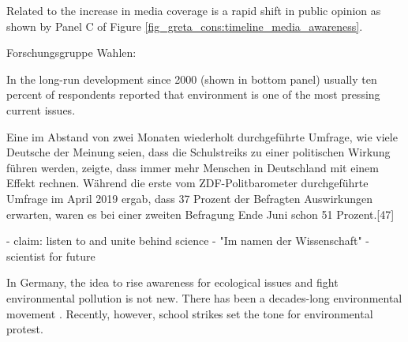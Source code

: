 Related to the increase in media coverage is a rapid shift in public opinion \citep{smith2019window} as shown by Panel C of Figure \ref{fig_greta_cons:timeline_media_awareness}.

Forschungsgruppe Wahlen: \cite{politbarometer2019}

In the long-run development since 2000 (shown in bottom panel) usually ten percent of respondents reported that environment is one of the most pressing current issues.





 Eine im Abstand von zwei Monaten wiederholt durchgeführte Umfrage, wie viele Deutsche der Meinung seien, dass die Schulstreiks zu einer politischen Wirkung führen werden, zeigte, dass immer mehr Menschen in Deutschland mit einem Effekt rechnen. Während die erste vom ZDF-Politbarometer durchgeführte Umfrage im April 2019 ergab, dass 37 Prozent der Befragten Auswirkungen erwarten, waren es bei einer zweiten Befragung Ende Juni schon 51 Prozent.[47]









  
 
 - claim: listen to and unite behind science
 - "Im namen der Wissenschaft"
 - scientist for future \cite{warren2019thousands} \cite{hagedorn2019science}




In Germany, the idea to rise awareness for ecological issues and fight environmental pollution is not new. There has been a decades-long environmental movement \citep{smith2019window}. Recently, however, school strikes set the tone for environmental protest. 









\newpage





